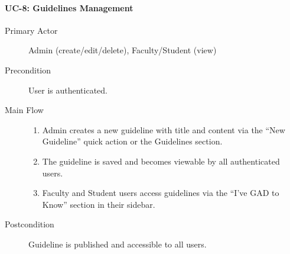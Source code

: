\documentclass[11pt,a4paper]{article}
\begin{document}
\paragraph{UC-8: Guidelines Management}
\begin{description}
  \item[Primary Actor] Admin (create/edit/delete), Faculty/Student (view)
  \item[Precondition] User is authenticated.
  \item[Main Flow]
    \begin{enumerate}[leftmargin=1.5em]
      \item Admin creates a new guideline with title and content via the ``New Guideline'' quick action or the Guidelines section.
      \item The guideline is saved and becomes viewable by all authenticated users.
      \item Faculty and Student users access guidelines via the ``I've GAD to Know'' section in their sidebar.
    \end{enumerate}
  \item[Postcondition] Guideline is published and accessible to all users.
\end{description}
\end{document}
